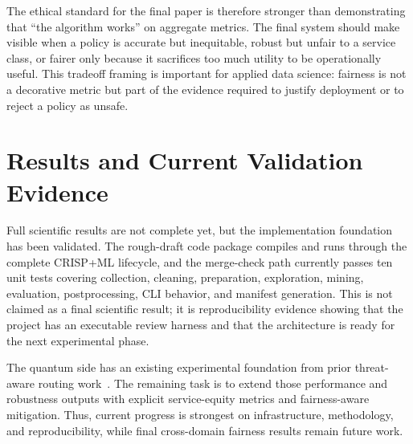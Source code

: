 \documentclass[conference]{IEEEtran}
\begin{document}
The ethical standard for the final paper is therefore stronger than
demonstrating that ``the algorithm works'' on aggregate metrics. The final
system should make visible when a policy is accurate but inequitable, robust
but unfair to a service class, or fairer only because it sacrifices too much
utility to be operationally useful. This tradeoff framing is important for
applied data science: fairness is not a decorative metric but part of the
evidence required to justify deployment or to reject a policy as unsafe.

\section{Results and Current Validation Evidence}
Full scientific results are not complete yet, but the implementation foundation
has been validated. The rough-draft code package compiles and runs through the
complete CRISP+ML lifecycle, and the merge-check path currently passes ten
unit tests covering collection, cleaning, preparation, exploration, mining,
evaluation, postprocessing, CLI behavior, and manifest generation. This is not
claimed as a final scientific result; it is reproducibility evidence showing
that the project has an executable review harness and that the architecture is
ready for the next experimental phase.

The quantum side has an existing experimental foundation from prior
threat-aware routing work~\cite{garcia2026threat_aware_quantum_routing}. The
remaining task is to extend those performance and robustness outputs with
explicit service-equity metrics and fairness-aware mitigation. Thus, current
progress is strongest on infrastructure, methodology, and reproducibility,
while final cross-domain fairness results remain future work.
\end{document}
